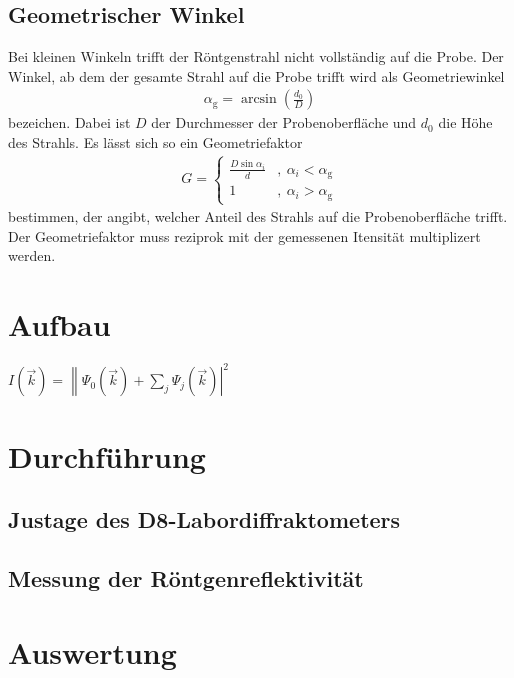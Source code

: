 \documentclass[captions=tableheading]{scrartcl}
\newcommand{\indx}[1]{\text{#1}}
\begin{document}
\subsection{Geometrischer Winkel}
Bei kleinen Winkeln trifft der Röntgenstrahl nicht vollständig auf die Probe. Der Winkel, ab dem der gesamte Strahl auf die Probe trifft wird als Geometriewinkel 
\begin{align}
\alpha_{\indx{g}}=\arcsin \left( \frac{d_0}{D} \right)
\end{align}
bezeichen. 
Dabei ist $D$ der Durchmesser der Probenoberfläche und $d_0$ die Höhe des Strahls.
Es lässt sich so ein Geometriefaktor 
\begin{align}
G=\left\lbrace\begin{matrix}
\frac{D \sin \alpha_{i} }{d} &,\ \alpha_{i} < \alpha_{\indx{g}} \\
1 &,\  \alpha_{i} > \alpha_{\indx{g}}
\end{matrix}\right.
\end{align}
bestimmen, der angibt, welcher Anteil des Strahls auf die Probenoberfläche trifft.
Der Geometriefaktor muss reziprok mit der gemessenen Itensität multiplizert werden.

\section{Aufbau}
$I\left(\vec{k}\right)=\left\|\Psi_0\left(\vec{k}\right)+\sum\limits_j\Psi_j\left( \vec{k} \right) \right|^2$

\section{Durchführung}

\subsection{Justage des D8-Labordiffraktometers}

\subsection{Messung der Röntgenreflektivität}

\section{Auswertung}
\end{document}
